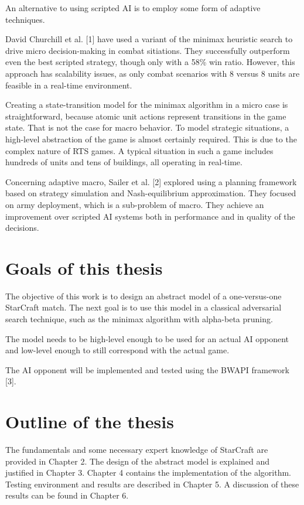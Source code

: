 An alternative to using scripted AI is to employ some form of adaptive techniques.

David Churchill et al. [1] have used a variant of the minimax heuristic search to drive micro decision-making in combat sitiations. They successfully outperform even the best scripted strategy, though only with a 58\% win ratio. However, this approach has scalability issues, as only combat scenarios with 8 versus 8 units are feasible in a real-time environment.

Creating a state-transition model for the minimax algorithm in a micro case is straightforward, because atomic unit actions represent transitions in the game state. That is not the case for macro behavior. To model strategic situations, a high-level abstraction of the game is almost certainly required. This is due to the complex nature of RTS games. A typical situation in such a game includes hundreds of units and tens of buildings, all operating in real-time.

Concerning adaptive macro, Sailer et al. [2] explored using a planning framework based on strategy simulation and Nash-equilibrium approximation. They focused on army deployment, which is a sub-problem of macro. They achieve an improvement over scripted AI systems both in performance and in quality of the decisions.

\section{Goals of this thesis}

The objective of this work is to design an abstract model of a one-versus-one StarCraft match. The next goal is to use this model in a classical adversarial search technique, such as the minimax algorithm with alpha-beta pruning.

The model needs to be high-level enough to be used for an actual AI opponent and low-level enough to still correspond with the actual game.

The AI opponent will be implemented and tested using the BWAPI framework [3].

\section{Outline of the thesis}

The fundamentals and some necessary expert knowledge of StarCraft are provided in Chapter 2. The design of the abstract model is explained and justified in Chapter 3. Chapter 4 contains the implementation of the algorithm. Testing environment and results are described in Chapter 5. A discussion of these results can be found in Chapter 6.

